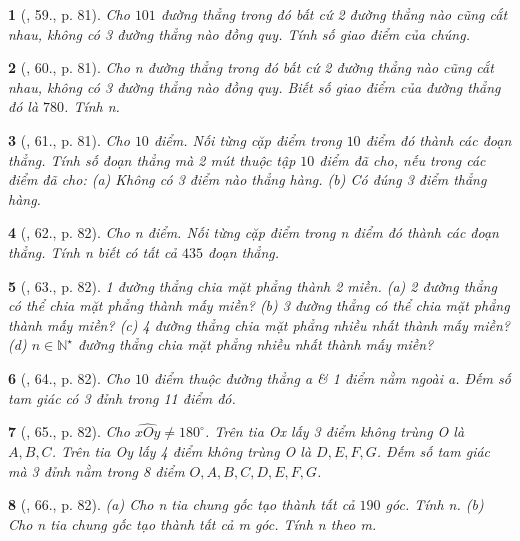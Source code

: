 \documentclass{article}
\newtheorem{baitoan}{}
\begin{document}
\begin{baitoan}[\cite{Binh_Toan_6_tap_2}, 59., p. 81]
	Cho $101$ đường thẳng trong đó bất cứ 2 đường thẳng nào cũng cắt nhau, không có 3 đường thẳng nào đồng quy. Tính số giao điểm của chúng.
\end{baitoan}

\begin{baitoan}[\cite{Binh_Toan_6_tap_2}, 60., p. 81]
	Cho n đường thẳng trong đó bất cứ 2 đường thẳng nào cũng cắt nhau, không có 3 đường thẳng nào đồng quy. Biết số giao điểm của đường thẳng đó là $780$. Tính n.
\end{baitoan}

\begin{baitoan}[\cite{Binh_Toan_6_tap_2}, 61., p. 81]
	Cho $10$ điểm. Nối từng cặp điểm trong $10$ điểm đó thành các đoạn thẳng. Tính số đoạn thẳng mà 2 mút thuộc tập $10$ điểm đã cho, nếu trong các điểm đã cho: (a) Không có 3 điểm nào thẳng hàng. (b) Có đúng 3 điểm thẳng hàng.
\end{baitoan}

\begin{baitoan}[\cite{Binh_Toan_6_tap_2}, 62., p. 82]
	Cho n điểm. Nối từng cặp điểm trong n điểm đó thành các đoạn thẳng. Tính n biết có tất cả $435$ đoạn thẳng.
\end{baitoan}

\begin{baitoan}[\cite{Binh_Toan_6_tap_2}, 63., p. 82]
	1 đường thẳng chia mặt phẳng thành 2 miền. (a) 2 đường thẳng có thể chia mặt phẳng thành mấy miền? (b) 3 đường thẳng có thể chia mặt phẳng thành mấy miền? (c) 4 đường thẳng chia mặt phẳng nhiều nhất thành mấy miền? (d) $n\in\mathbb{N}^\star$ đường thẳng chia mặt phẳng nhiều nhất thành mấy miền?
\end{baitoan}

\begin{baitoan}[\cite{Binh_Toan_6_tap_2}, 64., p. 82]
	Cho $10$ điểm thuộc đường thẳng a \& 1 điểm nằm ngoài a. Đếm số tam giác có 3 đỉnh trong 11 điểm đó.
\end{baitoan}

\begin{baitoan}[\cite{Binh_Toan_6_tap_2}, 65., p. 82]
	Cho $\widehat{xOy}\ne180^\circ$. Trên tia Ox lấy 3 điểm không trùng O là $A,B,C$. Trên tia Oy lấy 4 điểm không trùng O là $D,E,F,G$. Đếm số tam giác mà 3 đỉnh nằm trong 8 điểm $O,A,B,C,D,E,F,G$.
\end{baitoan}

\begin{baitoan}[\cite{Binh_Toan_6_tap_2}, 66., p. 82]
	(a) Cho n tia chung gốc tạo thành tất cả $190$ góc. Tính n. (b) Cho n tia chung gốc tạo thành tất cả m góc. Tính n theo m.
\end{baitoan}
\end{document}
